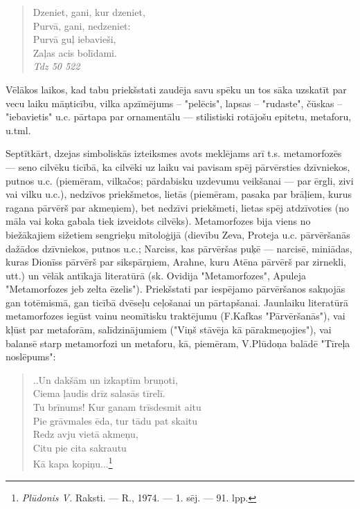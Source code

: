 \documentclass[11pt]{article}
\begin{document}
\begin{quote}
Dzeniet, gani, kur dzeniet,\\
Purvā, gani, nedzeniet:\\
Purvā guļ iebavieši,\\
Zaļas acis bolīdami.\\
{\em Tdz 50 522}
\end{quote}

Vēlākos laikos, kad tabu priekšstati zaudēja savu spēku
un tos sāka uzskatīt par vecu laiku māņticību, vilka
apzīmējums -- "pelēcis", lapsas -- "rudaste",
čūskas -- "iebavietis" u.c. pārtapa par ornamentālu ---
stilistiski rotājošu epitetu, metaforu, u.tml.

Septītkārt, dzejas simboliskās izteiksmes avots meklējams
arī t.s. metamorfozēs --- seno cilvēku ticībā,
ka cilvēki uz laiku vai pavisam spēj pārvērsties dzīvniekos,
putnos u.c. (piemēram, vilkačos; pārdabisku uzdevumu veikšanai ---
par ērgli, zivi vai vilku u.c.), nedzīvos priekšmetos,
lietās (piemēram, pasaka par brāļiem, kurus ragana pārvērš
par akmeņiem), bet nedzīvi priekšmeti, lietas spēj
atdzīvoties (no māla vai koka gabala tiek izveidots cilvēks).
Metamorfozes bija viens no biežākajiem sižetiem
sengrieķu mītoloģijā (dievību Zeva, Proteja u.c. pārvēršanās
dažādos dzīvniekos, putnos u.c.; Narciss, kas pārvēršas
puķē --- narcisē, miniādas, kuras Dionīss pārvērš par
sikspārņiem, Arahne, kuru Atēna pārvērš par zirnekli, utt.)
un vēlāk antīkajā literatūrā (sk. Ovidija "Metamorfozes",
Apuleja "Metamorfozes jeb zelta ēzelis"). Priekšstati
par iespējamo pārvēršanos sakņojās gan totēmismā, gan ticībā
dvēseļu ceļošanai un pārtapšanai. Jaunlaiku literatūrā
metamorfozes iegūst vainu neomītisku traktējumu
(F.Kafkas "Pārvēršanās"), vai kļūst par metaforām,
salīdzinājumiem ("Viņš stāvēja kā pārakmeņojies"),
vai balansē starp metamorfozi un metaforu, kā, piemēram,
V.Plūdoņa balādē "Tīreļa noslēpums":

\begin{quote}
..Un dakšām un izkaptīm bruņoti,\\
Ciema ļaudis drīz salasās tīrelī.\\
Tu brīnums! Kur ganam trīsdesmit aitu\\
Pie grāvmales ēda, tur tādu pat skaitu\\
Redz avju vietā akmeņu,\\
Citu pie cita sakrautu\\
Kā kapa kopiņu...\footnote{{\em Plūdonis V.} Raksti. ---
R., 1974. --- 1. sēj. --- 91. lpp.}
\end{quote}
\end{document}
